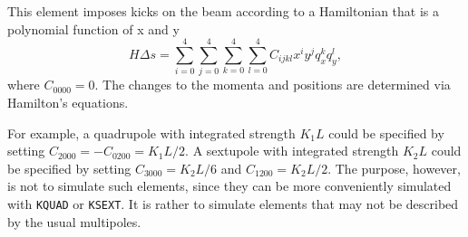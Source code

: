 This element imposes kicks on the beam according
to a Hamiltonian that is a polynomial function of x and y 
\begin{equation}
H\Delta s = \sum_{i=0}^{4} \sum_{j=0}^{4} \sum_{k=0}^4 \sum_{l=0}^4 C_{ijkl} x^i y^j q_x^k q_y^l,
\end{equation}
where $C_{0000} = 0$.
The changes to the momenta and positions are determined via Hamilton's equations.

For example, a quadrupole with integrated strength $K_1 L$  could be specified by setting $C_{2000} = -C_{0200} = K_1 L/2$.
A sextupole with integrated strength $K_2 L$ could be specified by setting $C_{3000} = K_2 L/6$ and $C_{1200} = K_2 L/2$.
The purpose, however, is not to simulate such elements, since they can be more conveniently simulated with 
\verb|KQUAD| or \verb|KSEXT|.
It is rather to simulate elements that may not be described by the usual multipoles.